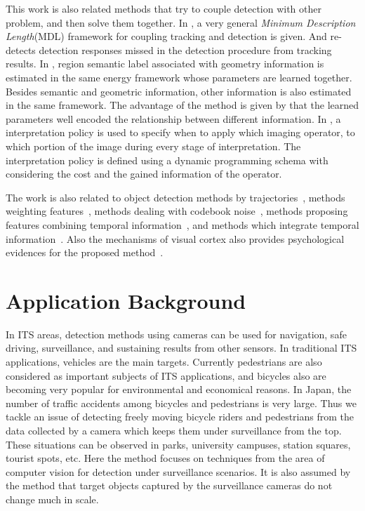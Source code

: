 This work is also related methods that try to couple detection with other problem, and then solve them together.
In \citep{my7}, a very general \emph{Minimum Description Length}(MDL) framework for
coupling tracking and detection is given. And \citep{ij10} re-detects
detection responses missed in the detection procedure from tracking results. In
\citep{ij14}, region semantic label associated with geometry
information is estimated in the same energy framework whose
parameters are learned together. Besides semantic and geometric information,
other information is also estimated in the same framework. The
advantage of the method is given by that the learned parameters well
encoded the relationship between different information. In
\citep{ij15},  a interpretation policy is used to specify when to
apply which imaging operator, to which portion of the image during
every stage of interpretation. The interpretation policy is defined
using a dynamic programming schema with considering the cost and the
gained information of the operator.



The work is also related to object detection methods by trajectories~\citep{my9,ac24}, methods weighting features~\citep{ij13}, methods dealing with codebook noise~\citep{ac19}, methods proposing features combining temporal information~\citep{stf}, and methods which integrate temporal information~\citep{ac23}. Also the mechanisms of visual cortex also provides psychological evidences for the proposed method~\citep{cfm}.


\section{Application Background}
\label{ab4}

In ITS areas, detection methods using cameras can be used for navigation, safe driving, surveillance, and sustaining results from other sensors. In traditional ITS applications, vehicles are the main targets. Currently pedestrians are also considered as important subjects of ITS applications, and bicycles also are becoming very popular for environmental and economical reasons. In Japan, the number of traffic accidents among bicycles and pedestrians is very large. Thus we tackle an issue of detecting freely moving bicycle riders and pedestrians from the data collected by a camera which keeps them under surveillance from the top. These situations can be observed in parks, university campuses, station squares, tourist spots, etc.  Here the method focuses on techniques from the area of computer vision for detection under surveillance scenarios. It is also assumed by the method that target objects captured by the surveillance cameras do not change much in scale.



